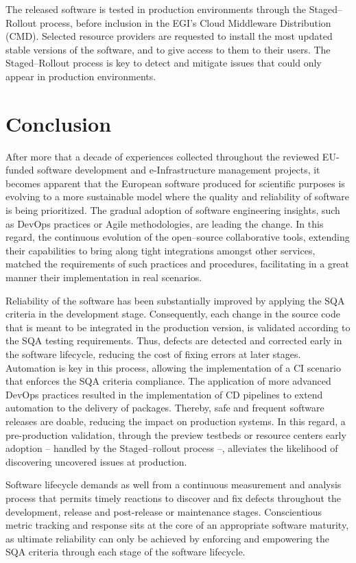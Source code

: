 \documentclass[journal]{IEEEtran}
\begin{document}
The released software is tested in production environments through the
Staged--Rollout process, before inclusion in the EGI's Cloud Middleware Distribution (CMD). 
Selected resource providers are requested to install
the most updated stable versions of the software, and to give access to them to their users. The
Staged--Rollout process is key to detect and mitigate issues that could only
appear in production environments.

\section{Conclusion}
\label{sec:con}

After more that a decade of experiences collected throughout the reviewed 
EU-funded software development and e-Infrastructure management projects, it 
becomes apparent that the European software produced for scientific purposes is
evolving to a more sustainable model where the quality and reliability of
software is being prioritized. The gradual adoption of software engineering insights, such as
DevOps practices or Agile methodologies, are leading the change. In this regard, the continuous evolution of the open--source
collaborative tools, extending their capabilities to bring along tight 
integrations amongst other services, matched the requirements of such practices
and procedures, facilitating in a great manner their implementation in real scenarios.

Reliability of the software has been substantially improved by applying the SQA
criteria in the development stage. Consequently, each change in the source code 
that is meant to be integrated in the production version, is validated according
to the SQA testing requirements. Thus, defects are detected and corrected early in the 
software lifecycle, reducing the cost of fixing errors at later stages. Automation is
key in this process, allowing the implementation of a CI scenario that enforces
the SQA criteria compliance. The application of more advanced DevOps practices
resulted in the implementation of CD pipelines to extend automation to the
delivery of packages. Thereby, safe and frequent software releases are doable, reducing
the impact on production systems. In this regard, a pre-production validation,
through the preview testbeds or resource centers early adoption -- handled by the
Staged--rollout process --, alleviates the likelihood of discovering uncovered
issues at production.

Software lifecycle demands as well from a continuous measurement and analysis
process that permits timely reactions to discover and fix defects throughout the
development, release and post-release or maintenance stages. Conscientious metric
tracking and response sits at the core of an appropriate software maturity, as 
ultimate reliability can only be achieved by enforcing and empowering the SQA 
criteria through each stage of the software lifecycle.
\end{document}
